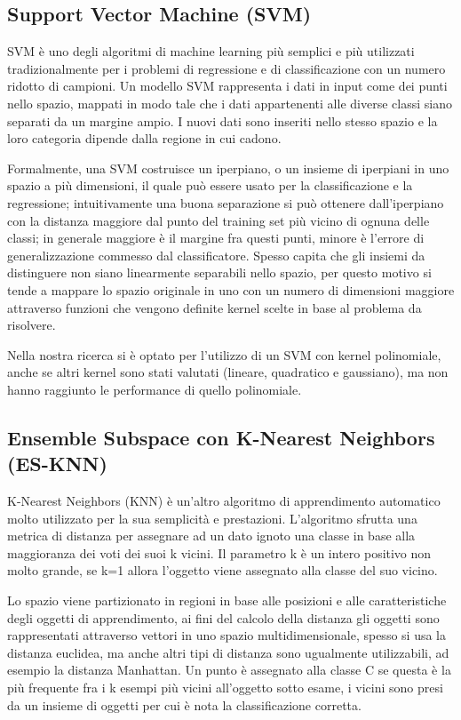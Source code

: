 \subsection{Support Vector Machine (SVM)}

SVM è uno degli algoritmi di machine learning più semplici e più utilizzati tradizionalmente per i problemi di regressione e di classificazione con un numero ridotto di campioni.
Un modello SVM rappresenta i dati in input come dei punti nello spazio, mappati in modo tale che i dati appartenenti alle diverse classi siano separati da un margine ampio. I nuovi 
dati sono inseriti nello stesso spazio e la loro categoria dipende dalla regione in cui cadono.

Formalmente, una SVM costruisce un iperpiano, o un insieme di iperpiani in uno spazio a più dimensioni, il quale può essere usato per la classificazione e la regressione; intuitivamente 
una buona separazione si può ottenere dall'iperpiano con la distanza maggiore dal punto del training set più vicino di ognuna delle classi; in generale maggiore è il margine fra questi 
punti, minore è l'errore di generalizzazione commesso dal classificatore. Spesso capita che gli insiemi da distinguere non siano linearmente separabili nello spazio, per questo motivo 
si tende a mappare lo spazio originale in uno con un numero di dimensioni maggiore attraverso funzioni che vengono definite kernel scelte in base al problema da risolvere.

Nella nostra ricerca si è optato per l'utilizzo di un SVM con kernel polinomiale, anche se altri kernel sono stati valutati (lineare, quadratico e gaussiano), ma non hanno raggiunto le performance 
di quello polinomiale.

\subsection{Ensemble Subspace con K-Nearest Neighbors (ES-KNN)}

K-Nearest Neighbors (KNN) è un'altro algoritmo di apprendimento automatico molto utilizzato per la sua semplicità e prestazioni. L'algoritmo sfrutta una metrica di distanza per assegnare ad 
un dato ignoto una classe in base alla maggioranza dei voti dei suoi k vicini. Il parametro k è un intero positivo non molto grande, se k=1 allora l'oggetto viene assegnato alla classe del suo vicino. 

Lo spazio viene partizionato in regioni in base alle posizioni e alle caratteristiche degli oggetti di apprendimento, ai fini del calcolo della distanza gli oggetti sono rappresentati attraverso 
vettori in uno spazio multidimensionale, spesso si usa la distanza euclidea, ma anche altri tipi di distanza sono ugualmente utilizzabili, ad esempio la distanza Manhattan. 
Un punto è assegnato alla classe C se questa è la più frequente fra i k esempi più vicini all'oggetto sotto esame, i vicini sono presi da un insieme di oggetti per cui è nota la classificazione corretta. 

